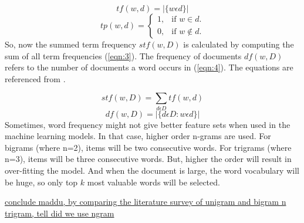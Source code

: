 \begin{equation}
\label{eqn:1}
tf(w,d) = |\{w \epsilon d\}|
\end{equation}
\begin{equation}
\label{eqn:2}
  tp(w,d)=\begin{cases}
    1, & \text{if $w \in d$}.\\
    0, & \text{if $w \not\in d$}.
  \end{cases}
\end{equation}
So, now the summed term frequency $stf(w,D)$ is calculated by computing the sum of all term frequencies (\ref{eqn:3}). The frequency of documents $df(w,D)$ refers to the number of documents a word occurs in (\ref{eqn:4}). The equations are referenced from \cite{groot2012data}.

\begin{equation}
\label{eqn:3}
stf(w,D) = \sum_{d \epsilon D} tf(w,d)
\end{equation}
\begin{equation}
\label{eqn:4}
df(w,D) = |\{d \epsilon D: w \epsilon d \}|
\end{equation}
Sometimes, word frequency might not give better feature sets when used in the machine learning models. In that case, higher order n-grams are used. For bigrams (where n=2), items will be two consecutive words. For trigrams (where n=3), items will be three consecutive words. But, higher the order will result in over-fitting the model. And when the document is large, the word vocabulary will be huge, so only top $k$ most valuable words will be selected.

\underline{conclude maddu, by comparing the literature survey of unigram and bigram n trigram, tell did we use ngram}

